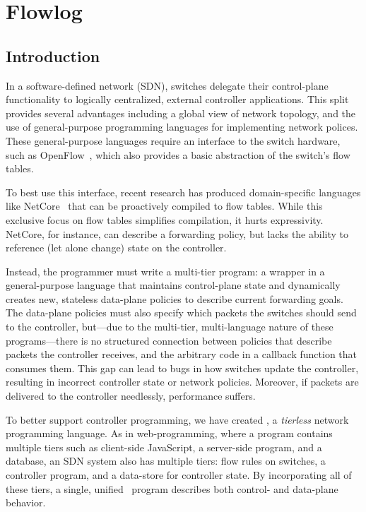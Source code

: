 
\chapter{Flowlog}

\section{Introduction}

In a software-defined network (SDN), switches delegate their control-plane
functionality to logically centralized, external controller applications.
This split provides several advantages including a global view of network
topology, and the use of general-purpose programming languages for implementing network polices.
These general-purpose languages require an interface
to the switch hardware, such as OpenFlow~\cite{McKeown:ccr08-openflow},
which also provides a basic abstraction of the switch's flow tables.

To best use this interface, recent research has produced domain-specific languages like
NetCore~\cite{monsanto:popl12-netcore} that can be proactively compiled to
flow tables. While this exclusive focus on flow tables simplifies compilation,
it hurts expressivity.
NetCore, for instance,
can describe a forwarding policy, but lacks the ability to reference (let alone
change) state on the controller.

Instead, the programmer must write a multi-tier program: a wrapper in a
general-purpose language that maintains control-plane state and dynamically creates new,
stateless data-plane policies to describe current forwarding goals. 
The data-plane policies must also specify
which packets the switches should send to the controller, but---due 
to the multi-tier, multi-language nature of these programs---there is no
structured connection between policies that describe packets the controller receives, and the arbitrary
code in a callback function that consumes them. This gap can lead to
bugs in how switches update the controller, resulting in incorrect
controller state or network policies. Moreover, if
packets are delivered to the controller needlessly, performance
suffers.

To better support controller programming, we have created \flowlog, a
\emph{tierless} network programming language. As in web-programming, where 
a program contains multiple tiers such as client-side JavaScript, a
server-side program, and a database, an SDN system also has multiple tiers:
flow rules on switches, a controller program, and a data-store for controller
state. By incorporating all of these tiers, a single, unified \flowlog\ 
program describes both control- and data-plane behavior.

